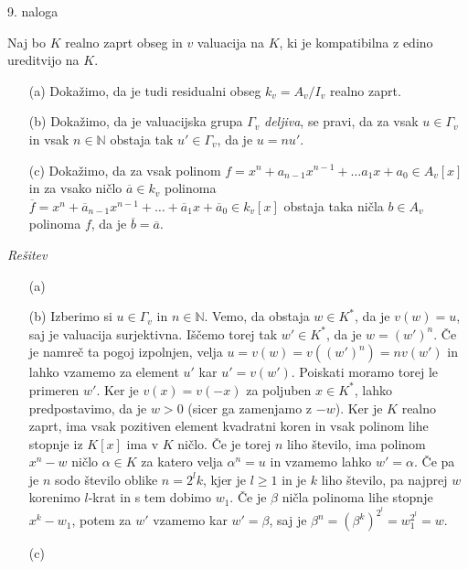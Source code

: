 \documentclass[a4paper, 12pt]{article}
\newcommand{\N}{\mathbb{N}}
\begin{document}
\begin{flushleft}
9. naloga
\end{flushleft}
Naj bo $K$ realno zaprt obseg in $v$ valuacija na $K$, ki je kompatibilna z edino ureditvijo na $K$. 
\begin{enumerate}
\item[(a)] Dokažimo, da je tudi residualni obseg $k_v = A_v / I_v$ realno zaprt.
\item[(b)] Dokažimo, da je valuacijska grupa $\Gamma_v$ \emph{deljiva}, se pravi, da za vsak $u \in \Gamma_v$ in vsak $n\in \N$ obstaja tak $u' \in \Gamma_v$, da je $u = nu'$.
\item[(c)] Dokažimo, da za vsak polinom $f=x^n + a_{n-1} x^{n-1} + \dots a_1 x + a_0 \in A_v[x]$ in za vsako ničlo $\overline{a} \in k_v$ polinoma  $\overline{f} =x^n + \overline{a}_{n-1} x^{n-1} + \dots +\overline{a}_1 x + \overline{a}_0 \in k_v[x]$ obstaja taka ničla $b\in A_v$ polinoma $f$, da je $\overline{b} = \overline{a}$.
\end{enumerate}
\emph{Rešitev}
\begin{enumerate}
\item[(a)] 

\item[(b)] Izberimo si $u\in \Gamma_v$ in $n\in \N$. Vemo, da obstaja $w\in K^*$, da je $v(w) = u$, saj je valuacija surjektivna. Iščemo torej tak $w'\in K^*$, da je $w = (w')^n$. Če je namreč ta pogoj izpolnjen, velja $u = v(w)=  v((w')^n) = nv(w')$ in lahko vzamemo za element $u'$ kar $u'=v(w')$. Poiskati moramo torej le primeren $w'$. Ker je $v(x) = v(-x)$ za poljuben $x\in K^*$, lahko predpostavimo, da je $w > 0$ (sicer ga zamenjamo z $-w$). Ker je $K$ realno zaprt, ima vsak pozitiven element kvadratni koren in vsak polinom lihe stopnje iz $K[x]$ ima v $K$ ničlo. Če je torej $n$ liho število, ima polinom $x^n - w$ ničlo $\alpha \in K$ za katero velja $\alpha^n = u$ in vzamemo lahko $w' = \alpha$. Če pa je $n$ sodo število oblike $n = 2^l k$, kjer je $l\ge 1$ in je $k$ liho število, pa najprej $w$ korenimo $l$-krat in s tem dobimo $w_1$. Če je $ \beta $ ničla polinoma lihe stopnje $x^k - w_1$, potem za $w'$ vzamemo kar $w' = \beta$, saj je $\beta^n = (\beta^k ) ^{2^l}   = w_1^{2^l} = w$. 

\item[(c)]

\end{enumerate}
\end{document}
